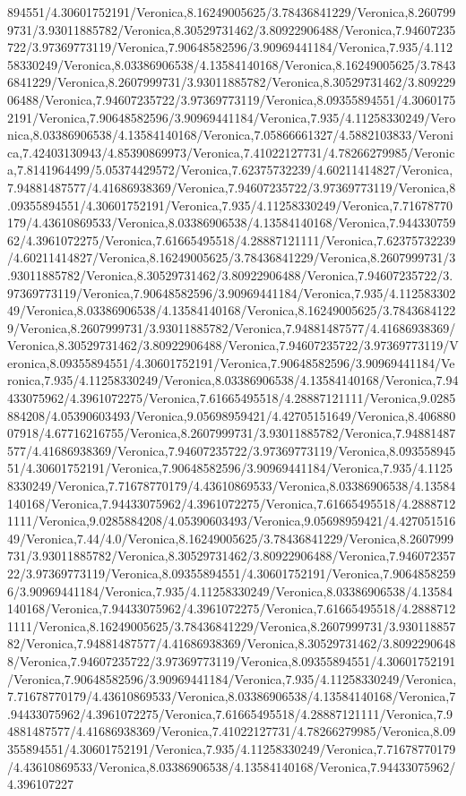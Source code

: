 {\begin{tikzternal}
{894551/4.30601752191/Veronica,8.16249005625/3.78436841229/Veronica,8.2607999731/3.93011885782/Veronica,8.30529731462/3.80922906488/Veronica,7.94607235722/3.97369773119/Veronica,7.90648582596/3.90969441184/Veronica,7.935/4.11258330249/Veronica,8.03386906538/4.13584140168/Veronica,8.16249005625/3.78436841229/Veronica,8.2607999731/3.93011885782/Veronica,8.30529731462/3.80922906488/Veronica,7.94607235722/3.97369773119/Veronica,8.09355894551/4.30601752191/Veronica,7.90648582596/3.90969441184/Veronica,7.935/4.11258330249/Veronica,8.03386906538/4.13584140168/Veronica,7.05866661327/4.5882103833/Veronica,7.42403130943/4.85390869973/Veronica,7.41022127731/4.78266279985/Veronica,7.8141964499/5.05374429572/Veronica,7.62375732239/4.60211414827/Veronica,7.94881487577/4.41686938369/Veronica,7.94607235722/3.97369773119/Veronica,8.09355894551/4.30601752191/Veronica,7.935/4.11258330249/Veronica,7.71678770179/4.43610869533/Veronica,8.03386906538/4.13584140168/Veronica,7.94433075962/4.3961072275/Veronica,7.61665495518/4.28887121111/Veronica,7.62375732239/4.60211414827/Veronica,8.16249005625/3.78436841229/Veronica,8.2607999731/3.93011885782/Veronica,8.30529731462/3.80922906488/Veronica,7.94607235722/3.97369773119/Veronica,7.90648582596/3.90969441184/Veronica,7.935/4.11258330249/Veronica,8.03386906538/4.13584140168/Veronica,8.16249005625/3.78436841229/Veronica,8.2607999731/3.93011885782/Veronica,7.94881487577/4.41686938369/Veronica,8.30529731462/3.80922906488/Veronica,7.94607235722/3.97369773119/Veronica,8.09355894551/4.30601752191/Veronica,7.90648582596/3.90969441184/Veronica,7.935/4.11258330249/Veronica,8.03386906538/4.13584140168/Veronica,7.94433075962/4.3961072275/Veronica,7.61665495518/4.28887121111/Veronica,9.0285884208/4.05390603493/Veronica,9.05698959421/4.42705151649/Veronica,8.40688007918/4.67716216755/Veronica,8.2607999731/3.93011885782/Veronica,7.94881487577/4.41686938369/Veronica,7.94607235722/3.97369773119/Veronica,8.09355894551/4.30601752191/Veronica,7.90648582596/3.90969441184/Veronica,7.935/4.11258330249/Veronica,7.71678770179/4.43610869533/Veronica,8.03386906538/4.13584140168/Veronica,7.94433075962/4.3961072275/Veronica,7.61665495518/4.28887121111/Veronica,9.0285884208/4.05390603493/Veronica,9.05698959421/4.42705151649/Veronica,7.44/4.0/Veronica,8.16249005625/3.78436841229/Veronica,8.2607999731/3.93011885782/Veronica,8.30529731462/3.80922906488/Veronica,7.94607235722/3.97369773119/Veronica,8.09355894551/4.30601752191/Veronica,7.90648582596/3.90969441184/Veronica,7.935/4.11258330249/Veronica,8.03386906538/4.13584140168/Veronica,7.94433075962/4.3961072275/Veronica,7.61665495518/4.28887121111/Veronica,8.16249005625/3.78436841229/Veronica,8.2607999731/3.93011885782/Veronica,7.94881487577/4.41686938369/Veronica,8.30529731462/3.80922906488/Veronica,7.94607235722/3.97369773119/Veronica,8.09355894551/4.30601752191/Veronica,7.90648582596/3.90969441184/Veronica,7.935/4.11258330249/Veronica,7.71678770179/4.43610869533/Veronica,8.03386906538/4.13584140168/Veronica,7.94433075962/4.3961072275/Veronica,7.61665495518/4.28887121111/Veronica,7.94881487577/4.41686938369/Veronica,7.41022127731/4.78266279985/Veronica,8.09355894551/4.30601752191/Veronica,7.935/4.11258330249/Veronica,7.71678770179/4.43610869533/Veronica,8.03386906538/4.13584140168/Veronica,7.94433075962/4.396107227}
\end{tikzternal}}
